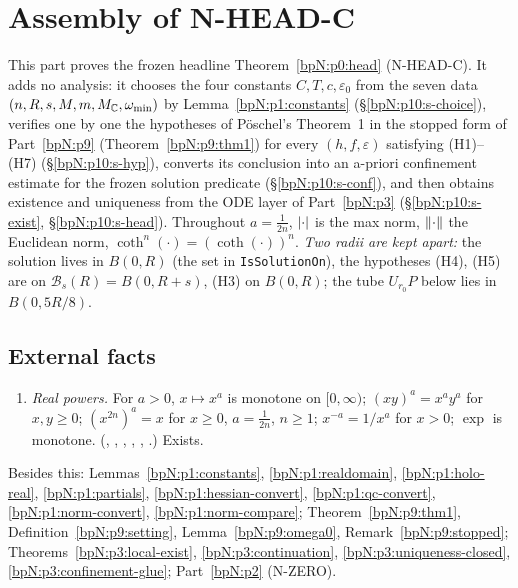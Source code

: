 \section{Assembly of N-HEAD-C}\label{bpN:p10}
\providecommand{\wn}[3]{\lvert #1\rvert_{#2,#3}}
\providecommand{\UD}[1]{U_{#1}D}
\providecommand{\Os}[2]{\mathcal O(#1,#2)}
\begingroup\sloppy

This part proves the frozen headline Theorem~\ref{bpN:p0:head} (N-HEAD-C). It adds no analysis: it chooses the four constants
$C,T,c,\varepsilon_0$ from the seven data $(n,R,s,M,m,M_{\mathbb{C}},\omega_{\min})$ by Lemma~\ref{bpN:p1:constants}
(\S\ref{bpN:p10:s-choice}), verifies one by one the hypotheses of P\"oschel's Theorem~1 in the stopped form of Part~\ref{bpN:p9}
(Theorem~\ref{bpN:p9:thm1}) for every $(h,f,\varepsilon)$ satisfying (H1)--(H7) (\S\ref{bpN:p10:s-hyp}), converts its conclusion into an a-priori
confinement estimate for the frozen solution predicate (\S\ref{bpN:p10:s-conf}), and then obtains existence and uniqueness from the ODE layer of
Part~\ref{bpN:p3} (\S\ref{bpN:p10:s-exist}, \S\ref{bpN:p10:s-head}). Throughout $a=\frac1{2n}$, $\lvert \cdot\rvert$ is the max norm,
$\lVert \cdot\rVert$ the Euclidean norm, $\coth^n(\cdot)=(\coth(\cdot))^n$. \emph{Two radii are kept apart:} the solution lives in $B(0,R)$ (the set in
\texttt{IsSolutionOn}), the hypotheses (H4), (H5) are on $\mathcal B_s(R)=B(0,R+s)$, (H3) on $B(0,R)$; the tube $U_{r_0}P$ below lies in $B(0,5R/8)$.

\subsection{External facts}\label{bpN:p10:s-ext}
\begin{enumerate}[label=(E\arabic*),leftmargin=2.2em]
\item\label{bpN:p10:ext-rpow} \emph{Real powers.} For $a>0$, $x\mapsto x^a$ is monotone on $[0,\infty)$; $(xy)^a=x^ay^a$ for $x,y\ge0$; $(x^{2n})^{a}=x$ for $x\ge0$, $a=\frac1{2n}$,
  $n\ge1$; $x^{-a}=1/x^a$ for $x>0$; $\exp$ is monotone. (, , , , , .) Exists.
\end{enumerate}
Besides this: Lemmas~\ref{bpN:p1:constants}, \ref{bpN:p1:realdomain}, \ref{bpN:p1:holo-real}, \ref{bpN:p1:partials}, \ref{bpN:p1:hessian-convert}, \ref{bpN:p1:qc-convert},
\ref{bpN:p1:norm-convert}, \ref{bpN:p1:norm-compare}; Theorem~\ref{bpN:p9:thm1}, Definition~\ref{bpN:p9:setting}, Lemma~\ref{bpN:p9:omega0}, Remark~\ref{bpN:p9:stopped};
Theorems~\ref{bpN:p3:local-exist}, \ref{bpN:p3:continuation}, \ref{bpN:p3:uniqueness-closed}, \ref{bpN:p3:confinement-glue}; Part~\ref{bpN:p2} (N-ZERO).

